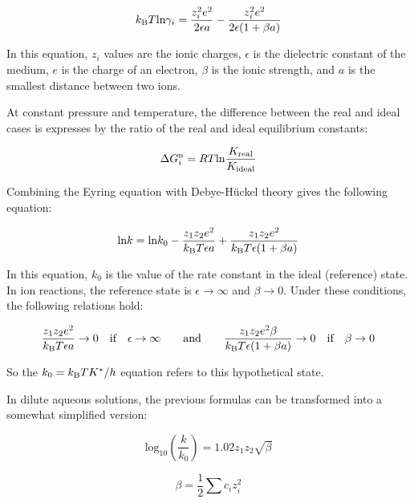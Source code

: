 \begin{equation}
k_{\text B} T \text {ln} \gamma_i = \frac{z_i^2 e^2}{2 \epsilon a} - \frac{z_i^2 e^2}{2 \epsilon (1 + \beta a)}
\end{equation}

In this equation, $z_i$ values are the ionic charges,  $\epsilon$ is the dielectric constant of the medium, $e$ is the charge of an electron, $\beta$ is the ionic strength, and $a$ is the smallest distance between two ions. 

At constant pressure and temperature, the difference between the real and ideal cases is expresses by the ratio of the real and ideal  equilibrium constants:

\begin{equation}
\Delta G_i^{\text n} = R T \text {ln} \frac{K_\text{real}}{K_\text{ideal}}
\end{equation}

Combining the Eyring equation with Debye-H\"uckel theory gives the following equation:

\begin{equation}
\text {ln} k = \text {ln} k_0 - \frac{z_1 z_2 e^2}{k_{\text B} T \epsilon a} + \frac{z_1 z_2 e^2}{k_{\text B} T \epsilon (1 + \beta a)}
\end{equation}

In this equation, $k_0$ is the value of the rate constant in the ideal (reference) state. In ion reactions, the reference state is $\epsilon \rightarrow \infty$ and $\beta \rightarrow 0$. Under these conditions, the following relations hold:

\begin{equation}
 \frac{z_1 z_2 e^2}{k_{\text B} T \epsilon a} \rightarrow 0 \quad \text{if} \quad \epsilon \rightarrow \infty \quad \quad \text{and} \quad \quad  \frac{z_1 z_2 e^2 \beta}{k_{\text B} T \epsilon (1 + \beta a)} \rightarrow 0 \quad \text{if} \quad \beta \rightarrow 0
\end{equation}

So the $k_0 = k_{\text B} T K^* / h$ equation refers to this hypothetical state.

In dilute aqueous solutions, the previous formulas can be transformed into a somewhat simplified version:

\begin{equation}
\label{bronsted}
\text {log}_{10} \left ( \frac{k}{k_0} \right ) = 1.02 z_1 z_2 \sqrt{\beta}
\end{equation}

\begin{equation}
\beta = \frac{1}{2} \sum c_i z_i^2
\end{equation}

